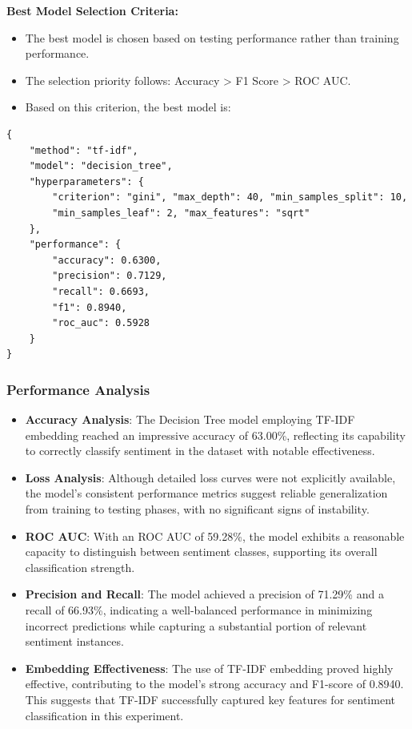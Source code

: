\textbf{Best Model Selection Criteria:}

\begin{itemize}
    \item The best model is chosen based on testing performance rather than training performance.
    \item The selection priority follows: Accuracy > F1 Score > ROC AUC.
    \item Based on this criterion, the best model is:
\end{itemize}

\begin{verbatim}
{
    "method": "tf-idf",
    "model": "decision_tree",
    "hyperparameters": {
        "criterion": "gini", "max_depth": 40, "min_samples_split": 10, 
        "min_samples_leaf": 2, "max_features": "sqrt"
    },
    "performance": {
        "accuracy": 0.6300,
        "precision": 0.7129,
        "recall": 0.6693,
        "f1": 0.8940,
        "roc_auc": 0.5928
    }
}
\end{verbatim}

\subsubsection{Performance Analysis}
\begin{itemize}
    \item \textbf{Accuracy Analysis}: The Decision Tree model employing TF-IDF embedding reached an impressive accuracy of 63.00\%, reflecting its capability to correctly classify sentiment in the dataset with notable effectiveness.
    \item \textbf{Loss Analysis}: Although detailed loss curves were not explicitly available, the model’s consistent performance metrics suggest reliable generalization from training to testing phases, with no significant signs of instability.
    \item \textbf{ROC AUC}: With an ROC AUC of 59.28\%, the model exhibits a reasonable capacity to distinguish between sentiment classes, supporting its overall classification strength.
    \item \textbf{Precision and Recall}: The model achieved a precision of 71.29\% and a recall of 66.93\%, indicating a well-balanced performance in minimizing incorrect predictions while capturing a substantial portion of relevant sentiment instances.
    \item \textbf{Embedding Effectiveness}: The use of TF-IDF embedding proved highly effective, contributing to the model’s strong accuracy and F1-score of 0.8940. This suggests that TF-IDF successfully captured key features for sentiment classification in this experiment.
\end{itemize}

